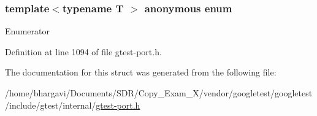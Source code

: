 \subsubsection[{\texorpdfstring{anonymous enum}{anonymous enum}}]{\setlength{\rightskip}{0pt plus 5cm}template$<$typename T $>$ anonymous enum}\hypertarget{structtesting_1_1internal_1_1_static_assert_type_eq_helper_3_01_t_00_01_t_01_4_acdb69a9c4164628ea6a80bd6442058c6}{}\label{structtesting_1_1internal_1_1_static_assert_type_eq_helper_3_01_t_00_01_t_01_4_acdb69a9c4164628ea6a80bd6442058c6}
\begin{Desc}
\item[Enumerator]\par
\begin{description}
\item[{\em 
value\hypertarget{structtesting_1_1internal_1_1_static_assert_type_eq_helper_3_01_t_00_01_t_01_4_acdb69a9c4164628ea6a80bd6442058c6a63c475f543e4e977d43c5093dd2b7f3f}{}\label{structtesting_1_1internal_1_1_static_assert_type_eq_helper_3_01_t_00_01_t_01_4_acdb69a9c4164628ea6a80bd6442058c6a63c475f543e4e977d43c5093dd2b7f3f}
}]\end{description}
\end{Desc}


Definition at line 1094 of file gtest-\/port.\+h.



The documentation for this struct was generated from the following file\+:\begin{DoxyCompactItemize}
\item 
/home/bhargavi/\+Documents/\+S\+D\+R/\+Copy\+\_\+\+Exam\+\_\+X/vendor/googletest/googletest/include/gtest/internal/\hyperlink{gtest-port_8h}{gtest-\/port.\+h}\end{DoxyCompactItemize}

